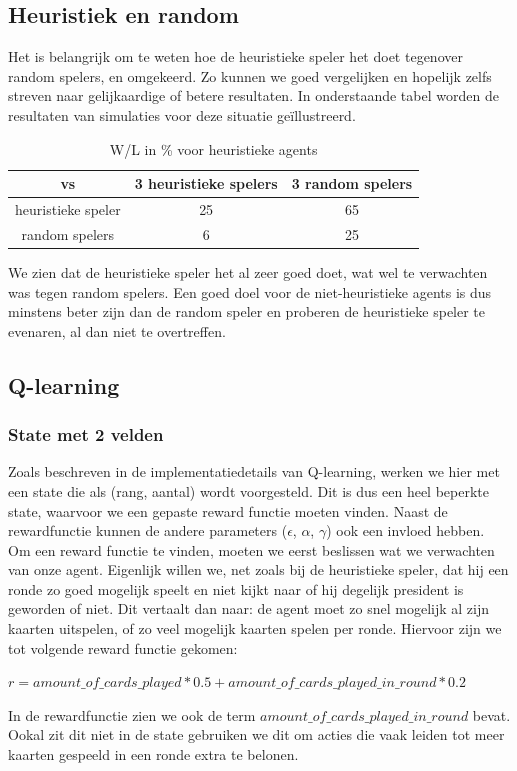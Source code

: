 \documentclass[11pt]{article}
\begin{document}
\subsection{Heuristiek en random}
Het is belangrijk om te weten hoe de heuristieke speler het doet tegenover random spelers, en omgekeerd. Zo kunnen we goed vergelijken en hopelijk zelfs streven naar gelijkaardige of betere resultaten. In onderstaande tabel worden de resultaten van simulaties voor deze situatie geïllustreerd.
\begin{table}[H]
        \centering
        \begin{tabular}{|c|c|c|}
                \hline
                  vs                & 3 heuristieke spelers & 3 random spelers \\
                \hline
                 heuristieke speler & 25         & 65\\
                 random spelers     & 6         & 25\\
                \hline
        \end{tabular}
        \caption{W/L in \% voor heuristieke agents}
\end{table}

We zien dat de heuristieke speler het al zeer goed doet, wat wel te verwachten was tegen random spelers. Een goed doel voor de niet-heuristieke agents is dus minstens beter zijn dan de random speler en proberen de heuristieke speler te evenaren, al dan niet te overtreffen.\\

\subsection{Q-learning}
\subsubsection{State met 2 velden}
Zoals beschreven in de implementatiedetails van Q-learning, werken we hier met een state die als (rang, aantal) wordt voorgesteld. Dit is dus een heel beperkte state, waarvoor we een gepaste reward functie moeten vinden. Naast de rewardfunctie kunnen de andere parameters ($\epsilon$, $\alpha$, $\gamma$) ook een invloed hebben.\\

Om een reward functie te vinden, moeten we eerst beslissen wat we verwachten van onze agent. Eigenlijk willen we, net zoals bij de heuristieke speler, dat hij een ronde zo goed mogelijk speelt en niet kijkt naar of hij degelijk president is geworden of niet. Dit vertaalt dan naar: de agent moet zo snel mogelijk al zijn kaarten uitspelen, of zo veel mogelijk kaarten spelen per ronde. Hiervoor zijn we tot volgende reward functie gekomen:
\begin{center}
$r = amount\_of\_cards\_played * 0.5 + amount\_of\_cards\_played\_in\_round * 0.2$
\end{center}
In de rewardfunctie zien we ook de term $amount\_of\_cards\_played\_in\_round$ bevat. Ookal zit dit niet in de state gebruiken we dit om acties die vaak leiden tot meer kaarten gespeeld in een ronde extra te belonen.\\\\
\end{document}
